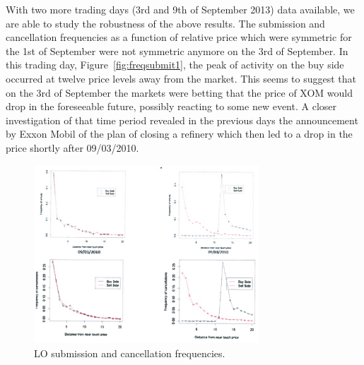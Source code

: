 With two more trading days (3rd and 9th of September 2013) data available, we are able to study the robustness of the above results. The submission and cancellation frequencies as a function of relative price which were symmetric for the 1st of September were not symmetric anymore on the 3rd of September. In this trading day, Figure~\ref{fig:freqsubmit1}, the peak of activity on the buy side occurred at twelve price levels away from the market. This seems to suggest that on the 3rd of September the markets were betting that the price of XOM would drop in the foreseeable future, possibly reacting to some new event. A closer investigation of that time period revealed in the previous days the announcement by Exxon Mobil of the plan of closing a refinery which then led to a drop in the price shortly after 09/03/2010.
	\begin{figure}[!ht]
   	\centering
   	\includegraphics[width=0.75\textwidth]{chapters/chapter_trade_data_models/figures/losubcanfreq.png} 
   	\caption{LO submission and cancellation frequencies. \label{fig:losubcanfreq}}
	\end{figure}


